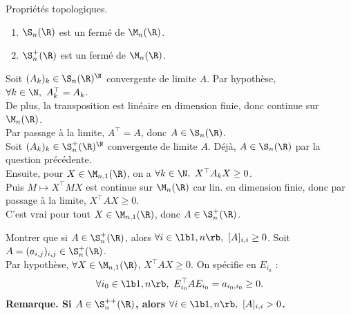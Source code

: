 \documentclass[11pt]{article}
\begin{document}
\begin{prop}{Propriétés topologiques.}{}
    \begin{enumerate}
        \item $\S_n(\R)$ est un fermé de $\M_n(\R)$.
        \item $\S_n^+(\R)$ est un fermé de $\M_n(\R)$.
    \end{enumerate}
    \tcblower
     Soit $(A_k)_k\in\S_n(\R)^\N$ convergente de limite $A$. Par hypothèse, $\forall k \in \N, ~ A_k^\top = A_k$.\\
    De plus, la transposition est linéaire en dimension finie, donc continue sur $\M_n(\R)$.\\
    Par passage à la limite, $A^\top = A$, donc $A\in\S_n(\R)$.\\
     Soit $(A_k)_k\in\S_n^+(\R)^\N$ convergente de limite $A$. Déjà, $A\in\S_n(\R)$ par la question précédente.\\
    Ensuite, pour $X\in\M_{n,1}(\R)$, on a $\forall k \in \N, ~ X^\top A_k X \geq 0$.\\
    Puis $M\mapsto X^\top M X$ est continue sur $\M_n(\R)$ car lin. en dimension finie, donc par passage à la limite, $X^\top AX \geq 0$.\\
    C'est vrai pour tout $X\in\M_{n,1}(\R)$, donc $A\in\S_n^+(\R)$. 
\end{prop}

\begin{exercice}{}{}
    Montrer que si $A\in\S_n^+(\R)$, alors $\forall i \in \lb1,n\rb, ~ [A]_{i,i}\geq0$.
    \tcblower
    Soit $A=(a_{i,j})_{i,j}\in\S_n^+(\R)$.\\
    Par hypothèse, $\forall X \in \M_{n,1}(\R)$, $X^\top AX\geq0$. On spécifie en $E_{i_0}$ :
    \begin{equation*}
        \forall i_0 \in \lb1,n\rb, ~ E_{i_0}^\top A E_{i_0} = a_{i_0,i_0}\geq 0.
    \end{equation*}
    \bf{Remarque.} Si $A\in\S_n^{++}(\R)$, alors $\forall i \in \lb1,n\rb, ~ [A]_{i,i}>0$.
\end{exercice}
\end{document}
